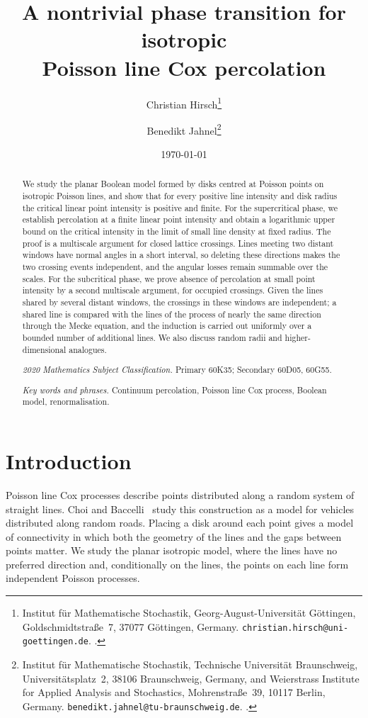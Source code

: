 \documentclass[11pt,letterpaper]{article}
\title{\textbf{A nontrivial phase transition for isotropic\\ Poisson line Cox percolation}}
\author{%
  Christian Hirsch\thanks{Institut f\"ur Mathematische Stochastik, Georg-August-Universit\"at G\"ottingen, Goldschmidtstra\ss e~7, 37077 G\"ottingen, Germany. \texttt{christian.hirsch@uni-goettingen.de}. \orcid{0000-0003-4136-3740}.}
  \and
  Benedikt Jahnel\thanks{Institut f\"ur Mathematische Stochastik, Technische Universit\"at Braunschweig, Universit\"atsplatz~2, 38106 Braunschweig, Germany, and Weierstrass Institute for Applied Analysis and Stochastics, Mohrenstra\ss e~39, 10117 Berlin, Germany. \texttt{benedikt.jahnel@tu-braunschweig.de}. \orcid{0000-0002-4212-0065}.}%
}
\date{\today}
\begin{document}
\maketitle
\thispagestyle{plain}

\begin{abstract}
We study the planar Boolean model formed by disks centred at Poisson points on isotropic Poisson lines, and show that for every positive line intensity and disk radius the critical linear point intensity is positive and finite. For the supercritical phase, we establish percolation at a finite linear point intensity and obtain a logarithmic upper bound on the critical intensity in the limit of small line density at fixed radius. The proof is a multiscale argument for closed lattice crossings. Lines meeting two distant windows have normal angles in a short interval, so deleting these directions makes the two crossing events independent, and the angular losses remain summable over the scales. For the subcritical phase, we prove absence of percolation at small point intensity by a second multiscale argument, for occupied crossings. Given the lines shared by several distant windows, the crossings in these windows are independent; a shared line is compared with the lines of the process of nearly the same direction through the Mecke equation, and the induction is carried out uniformly over a bounded number of additional lines. We also discuss random radii and higher-dimensional analogues.

\medskip
\noindent\textit{2020 Mathematics Subject Classification.} Primary 60K35; Secondary 60D05, 60G55.

\noindent\textit{Key words and phrases.} Continuum percolation, Poisson line Cox process, Boolean model, renormalisation.
\end{abstract}

\section{Introduction}
\label{sec:introduction}

Poisson line Cox processes describe points distributed along a random system of straight lines. Choi and Baccelli~\cite[Section~II]{ChBa18} study this construction as a model for vehicles distributed along random roads. Placing a disk around each point gives a model of connectivity in which both the geometry of the lines and the gaps between points matter. We study the planar isotropic model, where the lines have no preferred direction and, conditionally on the lines, the points on each line form independent Poisson processes.
\end{document}
